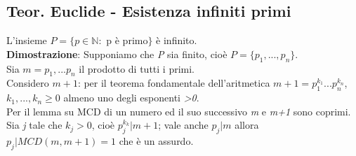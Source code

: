 \subsection{Teor. Euclide - Esistenza infiniti primi}
L'insieme \(P=\{p\in\mathbb{N} :\) p è primo\(\}\) è infinito.
\\
\textbf{Dimostrazione}: Supponiamo che \textit{P} sia finito, cioè \(P=\{p_1,...,p_n\}\).
\\
Sia \(m=p_1,...p_n\) il prodotto di tutti i primi.
\\
Considero \(m+1\): per il teorema fondamentale dell'aritmetica \(m+1=p_1^{k_1}...p_n^{k_n}\), \(k_1,...,k_n\geq 0\) almeno uno degli esponenti \textit{>0}.
\\
Per il lemma su MCD di un numero ed il suo successivo \textit{m} e \textit{m+1} sono coprimi.
\\
Sia \textit{j} tale che \(k_j>0\), cioè \(p_j^{k_k}|m+1\); vale anche \(p_j|m\) allora \(p_j|MCD(m, m+1)=1\) che è un assurdo.
